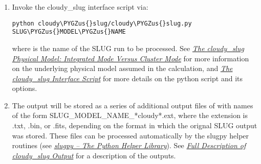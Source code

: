 \documentclass[letterpaper,10pt,english]{sphinxmanual}
\def\PYGZus{\char`\_}
\begin{document}
\begin{enumerate}
\item {} 
Invoke the cloudy\_slug interface script via:

\begin{Verbatim}[commandchars=\\\{\}]
python cloudy\PYGZus{}slug/cloudy\PYGZus{}slug.py SLUG\PYGZus{}MODEL\PYGZus{}NAME
\end{Verbatim}

where  is the name of the SLUG run to be
processed. See {\hyperref[cloudy:ssec-cloudy-cluster]{\emph{The cloudy\_slug Physical Model: Integrated Mode Versus Cluster Mode}}} for more information on
the underlying physical model assumed in the calculation, and
{\hyperref[cloudy:ssec-cloudy-slug-options]{\emph{The cloudy\_slug Interface Script}}} for more details on the python
script and its options.

\item {} 
The output will be stored as a series of additional output files of
with names of the form SLUG\_MODEL\_NAME\_*cloudy*.ext, where the
extension is .txt, .bin, or .fits, depending on the format in which
the orignal SLUG output was stored. These files can be processed
automatically by the slugpy helper routines (see
{\hyperref[slugpy:sec-slugpy]{\emph{slugpy -- The Python Helper Library}}}). See {\hyperref[cloudy:ssec-cloudy-output]{\emph{Full Description of cloudy\_slug Output}}} for a description
of the outputs.

\end{enumerate}
\end{document}
